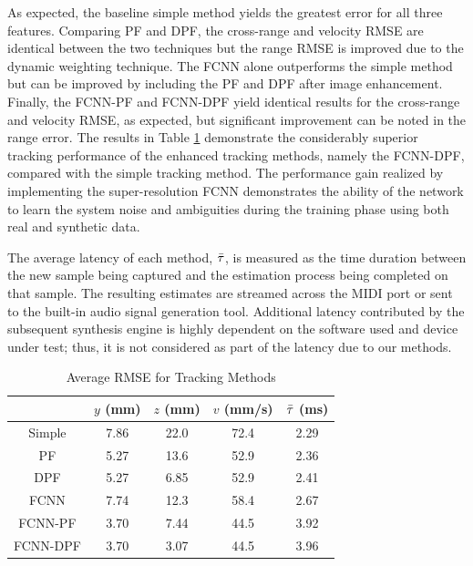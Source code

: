 \documentclass[10pt,journal,final]{IEEEtran}
\begin{document}
As expected, the baseline simple method yields the greatest error for all three features. 
Comparing PF and DPF, the cross-range and velocity RMSE are identical between the two techniques but the range RMSE is improved due to the dynamic weighting technique. 
The FCNN alone outperforms the simple method but can be improved by including the PF and DPF after image enhancement. 
Finally, the FCNN-PF and FCNN-DPF yield identical results for the cross-range and velocity RMSE, as expected, but significant improvement can be noted in the range error. 
The results in Table \ref{table:tracking_rmse2} demonstrate the considerably superior tracking performance of the enhanced tracking methods, namely the FCNN-DPF, compared with the simple tracking method.
The performance gain realized by implementing the super-resolution FCNN demonstrates the ability of the network to learn the system noise and ambiguities during the training phase using both real and synthetic data. 

The average latency of each method, $\Bar{\tau}$, is measured as the time duration between the new sample being captured and the estimation process being completed on that sample. 
The resulting estimates are streamed across the MIDI port or sent to the built-in audio signal generation tool. 
Additional latency contributed by the subsequent synthesis engine is highly dependent on the software used and device under test; thus, it is not considered as part of the latency due to our methods.

\begin{table} [h]
	\caption{Average RMSE for Tracking Methods}
	\centering
	\begin{tabular}{ | c || c | c | c | c | }
		\hline
		& $y$ (mm) & $z$ (mm) & $v$ (mm/s) & $\Bar{\tau}$ (ms) \\
		\hline\hline
		Simple & 7.86 & 22.0 & 72.4 & 2.29 \\
		\hline
		PF & 5.27 & 13.6 & 52.9 & 2.36 \\
		\hline
		DPF & 5.27 & 6.85 & 52.9 & 2.41 \\
		\hline
		FCNN & 7.74 & 12.3 & 58.4 & 2.67 \\
		\hline
		FCNN-PF & 3.70 & 7.44 & 44.5 & 3.92 \\
		\hline
		FCNN-DPF & 3.70 & 3.07 & 44.5 & 3.96 \\
		\hline
	\end{tabular}
	\label{table:tracking_rmse2}
\end{table}
\end{document}
